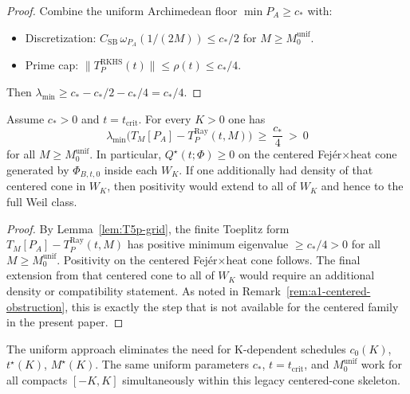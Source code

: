 \begin{proof}
Combine the uniform Archimedean floor $\min P_A \ge c_*$ with:
\begin{itemize}
  \item Discretization: $C_{\mathrm{SB}}\,\omega_{P_A}(1/(2M)) \le c_*/2$ for $M\ge M_0^{\mathrm{unif}}$.
  \item Prime cap: $\|T_P^{\mathrm{RKHS}}(t)\| \le \rho(t) \le c_*/4$.
\end{itemize}
Then $\lambda_{\min} \ge c_* - c_*/2 - c_*/4 = c_*/4$.
\end{proof}

\begin{theorem}\label{thm:T5-compact}
Assume $c_*>0$ and $t=t_{\mathrm{crit}}$. For every $K>0$ one has
\[
  \lambda_{\min}\!\big(T_{M}[P_A]-T_P^{\mathrm{Ray}}(t,M)\big)\ \ge\ \frac{c_*}{4}\ >\ 0
\]
for all $M\ge M_0^{\mathrm{unif}}$.
In particular, $Q^\star(t;\Phi)\ge0$ on the centered Fej\'er$\times$heat cone generated by $\Phi_{B,t,0}$ inside each $W_K$. If one additionally had density of that centered cone in $W_K$, then positivity would extend to all of $W_K$ and hence to the full Weil class.
\end{theorem}

\begin{proof}
By Lemma~\ref{lem:T5p-grid}, the finite Toeplitz form $T_M[P_A]-T_P^{\mathrm{Ray}}(t,M)$ has positive
minimum eigenvalue $\ge c_*/4 > 0$ for all $M\ge M_0^{\mathrm{unif}}$.
Positivity on the centered Fej\'er$\times$heat cone follows.
The final extension from that centered cone to all of $W_K$ would require an additional density or compatibility statement. As noted in Remark~\ref{rem:a1-centered-obstruction}, this is exactly the step that is not available for the centered family in the present paper.
\end{proof}

\begin{remark}
The uniform approach eliminates the need for K-dependent schedules $c_0(K)$, $t^\star(K)$, $M^\star(K)$.
The same uniform parameters $c_*$, $t=t_{\mathrm{crit}}$,
and $M_0^{\mathrm{unif}}$ work for all compacts $[-K,K]$ simultaneously within this legacy centered-cone skeleton.
\end{remark}

